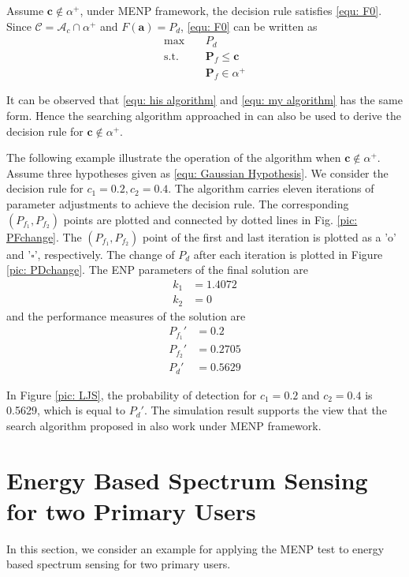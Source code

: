 \documentclass[12pt,journal,a4paper,twoside,onecolumn]{IEEEtran}
\begin{document}
\begin{spacing}{2.5}
Assume $\mathbf{c} \notin \alpha^+$, under MENP framework, the decision rule satisfies \eqref{equ: F0}. Since $\mathcal{C} = \mathcal{A}_c \cap \alpha^+$ and $F(\mathbf{a}) = P_d$, \eqref{equ: F0} can be written as
\begin{equation}
\begin{split}
\label{equ: my algorithm}
\max\;\;\;\;&P_d\\
\text{s.t.}\;\;\;\;&\mathbf{P}_f\leq \mathbf{c}\\
&\mathbf{P}_f \in \alpha^+ 
\end{split}
\end{equation}

It can be observed that \eqref{equ: his algorithm} and \eqref{equ: my algorithm} has the same form. Hence the searching algorithm approached in \cite{zhang1999desig} can also be used  to derive the decision rule for $\mathbf{c} \notin \alpha^+$. 

The following example illustrate the operation of the algorithm when $\mathbf{c} \notin \alpha^+$.
Assume three hypotheses given as \eqref{equ: Gaussian Hypothesis}. We consider the decision rule for $c_1 = 0.2, c_2 = 0.4$.  The algorithm carries eleven iterations of parameter adjustments to achieve the decision rule. The corresponding $(P_{f_1}, P_{f_2})$ points are plotted and connected by dotted lines in Fig. \ref{pic: PFchange}. The $(P_{f_1}, P_{f_2})$ point of the first and last iteration is plotted as a 'o' and '$\square$', respectively. The change of $P_d$ after each iteration is plotted in Figure \ref{pic: PDchange}.  The ENP parameters of the final solution are 
\[
\begin{split}
k_1 &= 1.4072\\
k_2 &= 0
\end{split}
\]
and the performance measures of the solution are
\[
\begin{split}
P_{f_1}' &= 0.2\\
P_{f_2}' &= 0.2705\\
P_d' &= 0.5629
\end{split}
\]

In Figure \ref{pic: LJS}, the probability of detection for $c_1 = 0.2$ and $c_2 = 0.4$ is 0.5629, which is equal to $P_d'$. The simulation result supports the view that the search algorithm proposed in \cite{zhang1999desig} also work under MENP framework.  


\section{Energy Based Spectrum Sensing for two Primary Users}
In this section, we consider an example for applying the MENP test to energy based spectrum sensing for two primary users.


\end{spacing}
\end{document}
